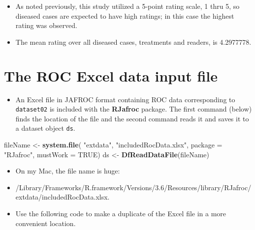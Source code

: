 \documentclass[]{book}
\newenvironment{Shaded}{\begin{snugshade}}{\end{snugshade}}
\newcommand{\CommentTok}[1]{\textcolor[rgb]{0.56,0.35,0.01}{\textit{#1}}}
\newcommand{\DataTypeTok}[1]{\textcolor[rgb]{0.13,0.29,0.53}{#1}}
\newcommand{\DecValTok}[1]{\textcolor[rgb]{0.00,0.00,0.81}{#1}}
\newcommand{\KeywordTok}[1]{\textcolor[rgb]{0.13,0.29,0.53}{\textbf{#1}}}
\newcommand{\NormalTok}[1]{#1}
\newcommand{\OperatorTok}[1]{\textcolor[rgb]{0.81,0.36,0.00}{\textbf{#1}}}
\newcommand{\OtherTok}[1]{\textcolor[rgb]{0.56,0.35,0.01}{#1}}
\newcommand{\StringTok}[1]{\textcolor[rgb]{0.31,0.60,0.02}{#1}}
\providecommand{\tightlist}{%
  \setlength{\itemsep}{0pt}\setlength{\parskip}{0pt}}
\begin{document}
\begin{Shaded}
\end{Shaded}

\begin{itemize}
\tightlist
\item
  As noted previously, this study utilized a 5-point rating scale, 1 thru 5, so diseased cases are expected to have high ratings; in this case the highest rating was observed.
\item
  The mean rating over all diseased cases, treatments and readers, is 4.2977778.
\end{itemize}

\hypertarget{the-roc-excel-data-input-file}{%
\section{The ROC Excel data input file}\label{the-roc-excel-data-input-file}}

\begin{itemize}
\tightlist
\item
  An Excel file in JAFROC format containing ROC data corresponding to \texttt{dataset02} is included with the \textbf{RJafroc} package. The first command (below) finds the location of the file and the second command reads it and saves it to a dataset object \texttt{ds}.
\end{itemize}

\begin{Shaded}
\begin{Highlighting}[]
\NormalTok{fileName <-}\StringTok{ }\KeywordTok{system.file}\NormalTok{(}
    \StringTok{"extdata"}\NormalTok{, }\StringTok{"includedRocData.xlsx"}\NormalTok{, }\DataTypeTok{package =} \StringTok{"RJafroc"}\NormalTok{, }\DataTypeTok{mustWork =} \OtherTok{TRUE}\NormalTok{)}
\NormalTok{ds <-}\StringTok{ }\KeywordTok{DfReadDataFile}\NormalTok{(fileName)}
\end{Highlighting}
\end{Shaded}

\begin{itemize}
\tightlist
\item
  On my Mac, the file name is huge:
\item
  /Library/Frameworks/R.framework/Versions/3.6/Resources/library/RJafroc/extdata/includedRocData.xlsx.
\item
  Use the following code to make a duplicate of the Excel file in a more convenient location.
\end{itemize}
\end{document}

